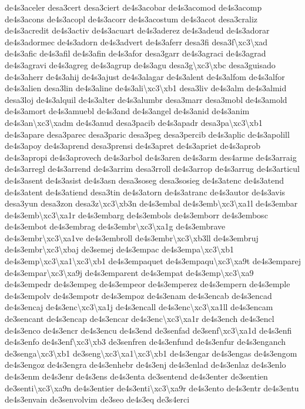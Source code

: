 \begin{DoxyCompactItemize}
de4s3aceler desa3cert desa3ciert de4s3acobar de4s3acomod de4s3acomp de4s3acons de4s3acopl de4s3acorr de4s3acostum de4s3acot desa3craliz de4s3acredit de4s3activ de4s3acuart de4s3aderez de4s3adeud de4s3adorar de4s3adormec de4s3adorn de4s3advert de4s3aferr desa3fi desa3f\textbackslash{}xc3\textbackslash{}xad de4s3afic de4s3afil de4s3afin de4s3afor desa3garr de4s3agraci de4s3agrad de4s3agravi de4s3agreg de4s3agrup de4s3agu desa3g\textbackslash{}xc3\textbackslash{}xbc desa3guisado de4s3aherr de4s3ahij de4s3ajust de4s3alagar de4s3alent de4s3alfom de4s3alfor de4s3alien desa3lin de4s3aline de4s3ali\textbackslash{}xc3\textbackslash{}xb1 desa3liv de4s3alm de4s3almid desa3loj de4s3alquil de4s3alter de4s3alumbr desa3marr desa3mobl de4s3amold de4s3amort de4s3amuebl de4s3and de4s3angel de4s3anid de4s3anim de4s3an\textbackslash{}xc3\textbackslash{}xadm de4s3anud desa3pacib de4s3apadr desa3pa\textbackslash{}xc3\textbackslash{}xb1 de4s3apare desa3parec desa3paric desa3peg desa3percib de4s3aplic de4s3apolill de4s3apoy de4s3aprend desa3prensi de4s3apret de4s3apriet de4s3aprob de4s3apropi de4s3aprovech de4s3arbol de4s3aren de4s3arm des4arme de4s3arraig de4s3arregl de4s3arrend de4s3arrim desa3rroll de4s3arrop de4s3arrug de4s3articul de4s3asent de4s3asist de4s3asn desa3soseg desa3sosieg de4s3atenc de4s3atend de4s3atent de4s3atiend desa3tin de4s3atorn de4s3atranc de4s3autor de4s3avis desa3yun desa3zon desa3z\textbackslash{}xc3\textbackslash{}xb3n de4s3embal de4s3emb\textbackslash{}xc3\textbackslash{}xa1l de4s3embar de4s3emb\textbackslash{}xc3\textbackslash{}xa1r de4s3embarg de4s3embols de4s3emborr de4s3embosc de4s3embot de4s3embrag de4s3embr\textbackslash{}xc3\textbackslash{}xa1g de4s3embrave de4s3embr\textbackslash{}xc3\textbackslash{}xa1ve de4s3embroll de4s3embr\textbackslash{}xc3\textbackslash{}xb3ll de4s3embruj de4s3embr\textbackslash{}xc3\textbackslash{}xbaj de3semej de4s3empac de4s3empa\textbackslash{}xc3\textbackslash{}xb1 de4s3emp\textbackslash{}xc3\textbackslash{}xa1\textbackslash{}xc3\textbackslash{}xb1 de4s3empaquet de4s3empaqu\textbackslash{}xc3\textbackslash{}xa9t de4s3emparej de4s3empar\textbackslash{}xc3\textbackslash{}xa9j de4s3emparent de4s3empat de4s3emp\textbackslash{}xc3\textbackslash{}xa9 de4s3empedr de4s3empeg de4s3empeor de4s3emperez de4s3empern de4s3emple de4s3empolv de4s3empotr de4s3empoz de4s3enam de4s3encab de4s3encad de4s3encaj de4s3enc\textbackslash{}xc3\textbackslash{}xa1j de4s3encall de4s3enc\textbackslash{}xc3\textbackslash{}xa1ll de4s3encam de3sencant de4s3encap de4s3encar de4s3enc\textbackslash{}xc3\textbackslash{}xa1r de4s3ench de4s3encl de4s3enco de4s3encr de4s3encu de4s3end de3senfad de3senf\textbackslash{}xc3\textbackslash{}xa1d de4s3enfi de4s3enfo de4s3enf\textbackslash{}xc3\textbackslash{}xb3 de3senfren de4s3enfund de4s3enfur de4s3enganch de3senga\textbackslash{}xc3\textbackslash{}xb1 de3seng\textbackslash{}xc3\textbackslash{}xa1\textbackslash{}xc3\textbackslash{}xb1 de4s3engar de4s3engas de4s3engom de4s3engoz de4s3engra de4s3enhebr de4s3enj de4s3enlad de4s3enlaz de4s3enlo de4s3enm de4s3enr de4s3ens de4s3enta de3sentend de4s3enter de3sentien de3senti\textbackslash{}xc3\textbackslash{}xa9n de4s3entier de4s3enti\textbackslash{}xc3\textbackslash{}xa9r de4s3ento de4s3entr de4s3entu de4s3envain de3senvolvim de3seo de4s3eq de3s4erci 
\end{DoxyCompactItemize}
